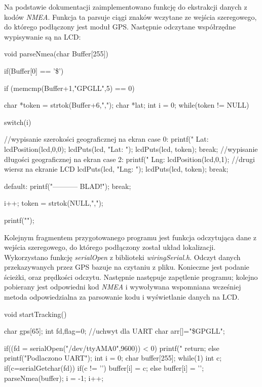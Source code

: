 \documentclass{article}
\begin{document}
		
		
		Na podstawie dokumentacji zaimplementowano  funkcję do ekstrakcji danych z kodów \textit{NMEA}. Funkcja ta parsuje ciągi znaków wczytane ze wejścia szeregowego, do którego podłączony jest moduł GPS. Następnie odczytane współrzędne wypisywanie są na LCD:
		\begin{verbatimtab}[4]
	void parseNmea(char Buffer[255])
	{
		if(Buffer[0] == '\$')
		{
		if (memcmp(Buffer+1,"GPGLL",5) == 0)
		{
			char *token = strtok(Buffer+6,",");
			char *lat;
			int i = 0;
			while(token != NULL)
			{
				switch(i)
				{
				//wypisanie szerokości geograficznej na ekran
				case 0:
					printf(" Lat: %
					lcdPosition(lcd,0,0); 
					lcdPuts(lcd, "Lat: ");
					lcdPuts(lcd, token);
				    break;
				 //wypisanie długości geograficznej na ekran
				case 2:
					printf(" Lng: %
					lcdPosition(lcd,0,1); //drugi wiersz na ekranie LCD
					lcdPuts(lcd, "Lng: "); 
					lcdPuts(lcd, token);
					break;		
			
				default:
					printf("----------- BLAD!\n");
					break;
				}
				i++;
				token = strtok(NULL,",");
				}
			printf("\n");
			}
		}
	}
	\end{verbatimtab}
	
	Kolejnym fragmentem przygotowanego programu jest funkcja odczytująca dane z wejścia szeregowego, do którego podłączony został układ lokalizacji. Wykorzystano funkcję \textit{serialOpen} z biblioteki \textit{wiringSerial.h}. Odczyt danych przekazywanych przez GPS bazuje na czytaniu z pliku. Konieczne jest podanie ścieżki, oraz prędkości odczytu. Następnie następuje zapętlenie programu; kolejno pobierany jest odpowiedni kod \textit{NMEA} i wywoływana wspomniana wcześniej metoda odpowiedzialna za parsowanie kodu i wyświetlanie danych na LCD.
	\begin{verbatimtab}[4]
	void startTracking()
	{
		char gps[65];
		int fd,flag=0; //uchwyt dla UART
		char arr[]="\$GPGLL";

		if((fd = serialOpen("/dev/ttyAMA0",9600)) < 0)
		{
			printf("%
			return;
		} 
		else
		{
			printf("Podlaczono UART\n");
		}
		int i = 0;
		char buffer[255];
		while(1)
		{
		int c;
			if(c=serialGetchar(fd))
			{
				if(c != '\n')
				{
					buffer[i] = c;
				}
				else 
				{
					buffer[i] = '\0';
					parseNmea(buffer);
					i = -1;
				}
				i++;
			}
		}
	}
	\end{verbatimtab}
	
\end{document}
